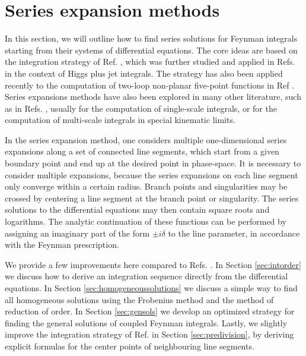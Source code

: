 \documentclass{article}
\begin{document}
\section{Series expansion methods}
\label{sec:seriesexpansionmethods}
In this section, we will outline how to find series solutions for Feynman integrals starting from their systems of differential equations. The core ideas are based on the integration strategy of Ref. \cite{Francesco:2019yqt}, which was further studied and applied in Refs. \cite{Frellesvig:2019byn, Bonciani:2019jyb} in the context of Higgs plus jet integrals. The strategy has also been applied recently to the computation of two-loop non-planar five-point functions in Ref \cite{Abreu:2020jxa}. Series expansions methods have also been explored in many other literature, such as in Refs. \cite{Pozzorini:2005ff,Aglietti:2007as,Mueller:2015lrx,Melnikov:2016qoc,Lee:2017qql,Melnikov:2017pgf,Lee:2018ojn,Bonciani:2018uvv,Mistlberger:2018etf,Bonciani:2018omm, Bruser:2018jnc,Davies:2018ood,Davies:2018qvx,Heller:2019gkq}, usually for the computation of single-scale integrals, or for the computation of multi-scale integrals in special kinematic limits.

In the series expansion method, one considers multiple one-dimensional series expansions along a set of connected line segments, which start from a given boundary point and end up at the desired point in phase-space. It is necessary to consider multiple expansions, because the series expansions on each line segment only converge within a certain radius. Branch points and singularities may be crossed by centering a line segment at the branch point or singularity. The series solutions to the differential equations may then contain square roots and logarithms. The analytic continuation of these functions can be performed by assigning an imaginary part of the form $\pm i\delta$ to the line parameter, in accordance with the Feynman prescription.

We provide a few improvements here compared to Refs. \cite{Francesco:2019yqt, Frellesvig:2019byn, Bonciani:2019jyb}. In Section \ref{sec:intorder} we discuss how to derive an integration sequence directly from the differential equations. In Section \ref{sec:homogeneoussolutions} we discuss a simple way to find all homogeneous solutions using the Frobenius method and the method of reduction of order. In Section \ref{sec:gensols} we develop an optimized strategy for finding the general solutions of coupled Feynman integrals. Lastly, we slightly improve the integration strategy of Ref. \cite{Frellesvig:2019byn} in Section \ref{sec:predivision}, by deriving explicit formulas for the center points of neighbouring line segments.
\end{document}
